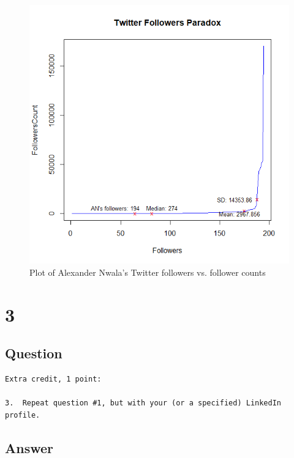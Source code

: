 \documentclass[letterpaper,11pt]{article}
\begin{document}
\begin{figure}[h]
\centering
\includegraphics[scale=0.6]{twfr.png}
\caption{Plot of Alexander Nwala's  Twitter followers vs. follower counts}
\label{fig:q2followers}
\end{figure}





\clearpage


\section*{3}

\subsection*{Question}

\begin{verbatim}
Extra credit, 1 point:

3.  Repeat question #1, but with your (or a specified) LinkedIn profile.

\end{verbatim}

\clearpage
\subsection*{Answer}
\end{document}
